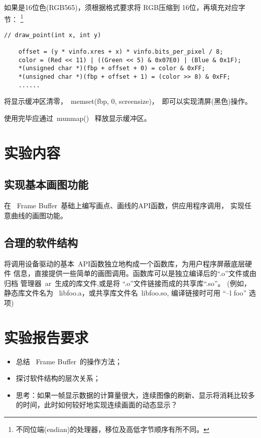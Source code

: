 	如果是16位色(RGB565)，须根据格式要求将 RGB压缩到 16位，再填充对应字节：
\footnote{不同位端(endian)的处理器，移位及高低字节顺序有所不同。}

\begin{boxedminipage}{.9\textwidth}
\begin{verbatim}
// draw_point(int x, int y)

    offset = (y * vinfo.xres + x) * vinfo.bits_per_pixel / 8;
    color = (Red << 11) | ((Green << 5) & 0x07E0) | (Blue & 0x1F);
    *(unsigned char *)(fbp + offset + 0) = color & 0xFF;
    *(unsigned char *)(fbp + offset + 1) = (color >> 8) & 0xFF;
    ......
\end{verbatim}
\end{boxedminipage}

	将显示缓冲区清零，~memset(fbp, 0, screensize)，~即可以实现清屏(黑色)操作。

使用完毕应通过~munmap()~ 释放显示缓冲区。
\section{实验内容}
\subsection{实现基本画图功能}
	在 ~Frame Buffer~基础上编写画点、画线的API函数，供应用程序调用，
实现任意曲线的画图功能。

\subsection{合理的软件结构}
    将调用设备驱动的基本~API函数独立地构成一个函数库，为用户程序屏蔽底层硬件
信息，直接提供一些简单的画图调用。函数库可以是独立编译后的``.o''文件或由归档
管理器~ar~生成的库文件,或是将 ``.o''文件链接而成的共享库``.so''。
(例如，静态库文件名为 ~libfoo.a，或共享库文件名~libfoo.so, 编译链接时可用
``--l foo'' 选项)

\section{实验报告要求}
\begin{itemize}\itemsep=-3pt
  \item 总结 ~Frame Buffer~的操作方法；
  \item 探讨软件结构的层次关系；
  \item 思考：如果一帧显示数据的计算量很大，连续图像的刷新、显示将消耗比较多
		的时间，此时如何较好地实现连续画面的动态显示？
\end{itemize}
